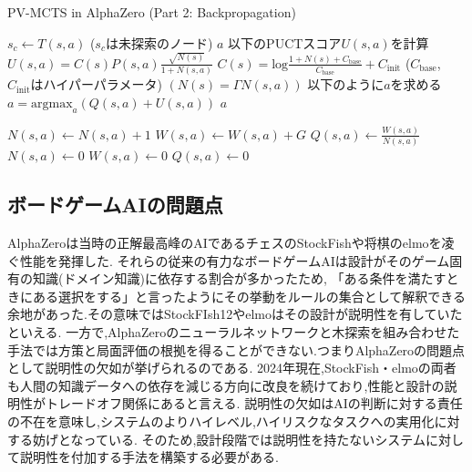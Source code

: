 \begin{algorithm}
    \caption{PV-MCTS in AlphaZero (Part 2: Backpropagation)}
    \label{alg:mcts-2}
    \begin{algorithmic}[1]
                \State $s_c \gets T(s, a)$ ($s_c$は未探索のノード)
                \State {}
                \State \Return $a$
            \Else
                \State 以下のPUCTスコア$U(s, a)$を計算
                \State $U(s, a)= C(s)P(s, a)\frac{\sqrt{N(s)}}{1+N(s, a)}$
                \State $C(s)=\textrm{log}\frac{1+N(s)+C_{\textrm{base}}}{C_{\textrm{base}}}+C_{\textrm{init}}$
                \State($C_{\textrm{base}}$, $C_{\textrm{init}}$はハイパーパラメータ)
                \State $(N(s)=\Gamma N(s, a))$
                \State 以下のように$a$を求める
                \State $a = {\textrm{argmax}}_a (Q(s, a)+U(s, a))$
                \State \Return $a$
                
            \EndIf
        \EndFunction
                \State $N(s, a) \gets  N(s, a)+1$
                \State $W(s, a) \gets  W(s, a)+G$
                \State $Q(s, a) \gets \frac{W(s, a)}{N(s, a)}$
            \EndFor
        \EndFunction
                \State $N(s, a) \gets 0$
                \State $W(s, a) \gets 0$
                \State $Q(s, a) \gets 0$
            \EndFor
        \EndFunction
    \end{algorithmic}
\end{algorithm}


\subsection{ボードゲームAIの問題点}
AlphaZeroは当時の正解最高峰のAIであるチェスのStockFish\cite{StockFish}や将棋のelmo\cite{elmo}を凌ぐ性能を発揮した.
それらの従来の有力なボードゲームAIは設計がそのゲーム固有の知識(ドメイン知識)に依存する割合が多かったため,
「ある条件を満たすときにある選択をする」と言ったようにその挙動をルールの集合として解釈できる余地があった.その意味ではStockFIsh12やelmoはその設計が説明性を有していたといえる.
一方で,AlphaZeroのニューラルネットワークと木探索を組み合わせた手法では方策と局面評価の根拠を得ることができない.つまりAlphaZeroの問題点として説明性の欠如が挙げられるのである.
2024年現在,StockFish・elmoの両者も人間の知識データへの依存を減じる方向に改良を続けており,性能と設計の説明性がトレードオフ関係にあると言える\cite{elmo}\cite{StockFish13}.
説明性の欠如はAIの判断に対する責任の不在を意味し,システムのよりハイレベル,ハイリスクなタスクへの実用化に対する妨げとなっている.
そのため,設計段階では説明性を持たないシステムに対して説明性を付加する手法を構築する必要がある.




